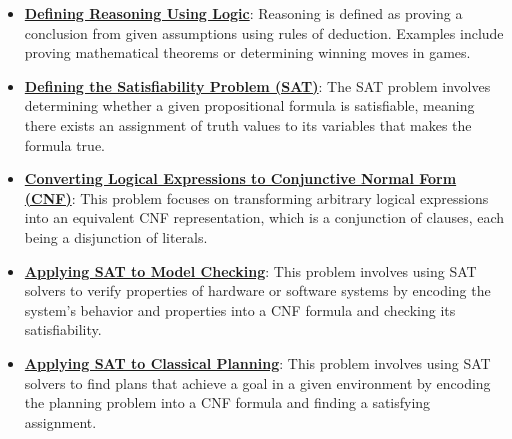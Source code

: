 \documentclass{article}%
\begin{document}
\begin{itemize}[leftmargin=*]%
\item \href{https://purdue.brightspace.com/d2l/common/assets/pdfjs-d2l-dist/1.0.14-legacy/web/viewer.html?file=\%2Fcontent\%2Fenforced\%2F1095467-wl.202510.CS.24300.001\%2F13L1-Logic.pdf\%3Fou\%3D1095467\&lang=en-us\&container=d2l-fileviewer-rendered-pdf\&fullscreen=d2l-fileviewer-rendered-pdf-dialog\&height=667#page=7}{\textbf{Defining Reasoning Using Logic}}: Reasoning is defined as proving a conclusion from given assumptions using rules of deduction. Examples include proving mathematical theorems or determining winning moves in games.%
\item \href{https://purdue.brightspace.com/d2l/common/assets/pdfjs-d2l-dist/1.0.14-legacy/web/viewer.html?file=\%2Fcontent\%2Fenforced\%2F1095467-wl.202510.CS.24300.001\%2F13L1-Logic.pdf\%3Fou\%3D1095467\&lang=en-us\&container=d2l-fileviewer-rendered-pdf\&fullscreen=d2l-fileviewer-rendered-pdf-dialog\&height=667#page=15}{\textbf{Defining the Satisfiability Problem (SAT)}}: The SAT problem involves determining whether a given propositional formula is satisfiable, meaning there exists an assignment of truth values to its variables that makes the formula true.%
\item \href{https://purdue.brightspace.com/d2l/common/assets/pdfjs-d2l-dist/1.0.14-legacy/web/viewer.html?file=\%2Fcontent\%2Fenforced\%2F1095467-wl.202510.CS.24300.001\%2F13L1-Logic.pdf\%3Fou\%3D1095467\&lang=en-us\&container=d2l-fileviewer-rendered-pdf\&fullscreen=d2l-fileviewer-rendered-pdf-dialog\&height=667#page=16}{\textbf{Converting Logical Expressions to Conjunctive Normal Form (CNF)}}: This problem focuses on transforming arbitrary logical expressions into an equivalent CNF representation, which is a conjunction of clauses, each being a disjunction of literals.%
\item \href{https://purdue.brightspace.com/d2l/common/assets/pdfjs-d2l-dist/1.0.14-legacy/web/viewer.html?file=\%2Fcontent\%2Fenforced\%2F1095467-wl.202510.CS.24300.001\%2F13L1-Logic.pdf\%3Fou\%3D1095467\&lang=en-us\&container=d2l-fileviewer-rendered-pdf\&fullscreen=d2l-fileviewer-rendered-pdf-dialog\&height=667#page=20}{\textbf{Applying SAT to Model Checking}}: This problem involves using SAT solvers to verify properties of hardware or software systems by encoding the system's behavior and properties into a CNF formula and checking its satisfiability.%
\item \href{https://purdue.brightspace.com/d2l/common/assets/pdfjs-d2l-dist/1.0.14-legacy/web/viewer.html?file=\%2Fcontent\%2Fenforced\%2F1095467-wl.202510.CS.24300.001\%2F13L1-Logic.pdf\%3Fou\%3D1095467\&lang=en-us\&container=d2l-fileviewer-rendered-pdf\&fullscreen=d2l-fileviewer-rendered-pdf-dialog\&height=667#page=21}{\textbf{Applying SAT to Classical Planning}}: This problem involves using SAT solvers to find plans that achieve a goal in a given environment by encoding the planning problem into a CNF formula and finding a satisfying assignment.%

\end{itemize}
\end{document}
